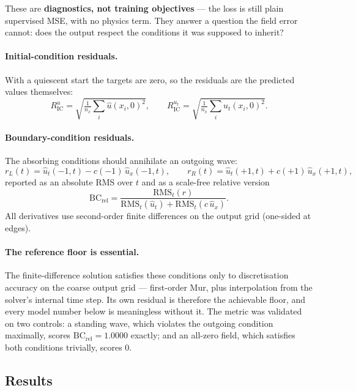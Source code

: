 \documentclass[11pt,a4paper]{article}
\begin{document}
These are \textbf{diagnostics, not training objectives} --- the loss is still
plain supervised MSE, with no physics term. They answer a question the field
error cannot: does the output respect the conditions it was supposed to inherit?

\paragraph{Initial-condition residuals.} With a quiescent start the targets are
zero, so the residuals are the predicted values themselves:
\begin{equation}
R_{\text{IC}}^{u}=\sqrt{\tfrac1{n_x}\textstyle\sum_i \hat u(x_i,0)^2},
\qquad
R_{\text{IC}}^{u_t}=\sqrt{\tfrac1{n_x}\textstyle\sum_i \hat u_t(x_i,0)^2}.
\end{equation}

\paragraph{Boundary-condition residuals.} The absorbing conditions should
annihilate an outgoing wave:
\begin{equation}
r_L(t)=\hat u_t(-1,t)-c(-1)\,\hat u_x(-1,t),
\qquad
r_R(t)=\hat u_t(+1,t)+c(+1)\,\hat u_x(+1,t),
\end{equation}
reported as an absolute RMS over $t$ and as a scale-free relative version
\begin{equation}
\text{BC}_{\text{rel}}=\frac{\mathrm{RMS}_t(r)}
{\mathrm{RMS}_t(\hat u_t)+\mathrm{RMS}_t(c\,\hat u_x)} .
\end{equation}
All derivatives use second-order finite differences on the output grid
(one-sided at edges).

\paragraph{The reference floor is essential.} The finite-difference solution
satisfies these conditions only to discretisation accuracy on the coarse output
grid --- first-order Mur, plus interpolation from the solver's internal time
step. Its own residual is therefore the achievable floor, and every model number
below is meaningless without it. The metric was validated on two controls: a
standing wave, which violates the outgoing condition maximally, scores
$\text{BC}_{\text{rel}}=1.0000$ exactly; and an all-zero field, which satisfies
both conditions trivially, scores $0$.

\subsection{Results}
\end{document}
